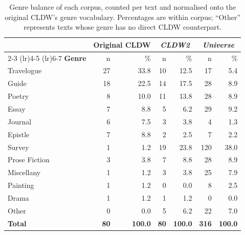 \begin{table}[htbp]
\centering
\caption{Genre balance of each corpus, counted per text and normalised onto the original CLDW's genre vocabulary. Percentages are within corpus; ``Other'' represents texts whose genre has no direct CLDW counterpart.}
\label{tab:genre-balance}
\begin{tabular}{@{}lrrrrrr@{}}
\toprule
 & \multicolumn{2}{c}{\textbf{Original CLDW}} & \multicolumn{2}{c}{\textbf{\emph{CLDW2}}} & \multicolumn{2}{c}{\textbf{\emph{Universe}}} \\
\cmidrule(lr){2-3} \cmidrule(lr){4-5} \cmidrule(lr){6-7}
\textbf{Genre} & n & \% & n & \% & n & \% \\
\midrule
Travelogue & 27 & 33.8 & 10 & 12.5 & 17 & 5.4 \\
Guide & 18 & 22.5 & 14 & 17.5 & 28 & 8.9 \\
Poetry & 8 & 10.0 & 11 & 13.8 & 28 & 8.9 \\
Essay & 7 & 8.8 & 5 & 6.2 & 29 & 9.2 \\
Journal & 6 & 7.5 & 3 & 3.8 & 4 & 1.3 \\
Epistle & 7 & 8.8 & 2 & 2.5 & 7 & 2.2 \\
Survey & 1 & 1.2 & 19 & 23.8 & 120 & 38.0 \\
Prose Fiction & 3 & 3.8 & 7 & 8.8 & 28 & 8.9 \\
Miscellany & 1 & 1.2 & 3 & 3.8 & 25 & 7.9 \\
Painting & 1 & 1.2 & 0 & 0.0 & 8 & 2.5 \\
Drama & 1 & 1.2 & 1 & 1.2 & 0 & 0.0 \\
Other & 0 & 0.0 & 5 & 6.2 & 22 & 7.0 \\
\midrule
\textbf{Total} & \textbf{80} & \textbf{100.0} & \textbf{80} & \textbf{100.0} & \textbf{316} & \textbf{100.0} \\
\bottomrule
\end{tabular}
\end{table}

